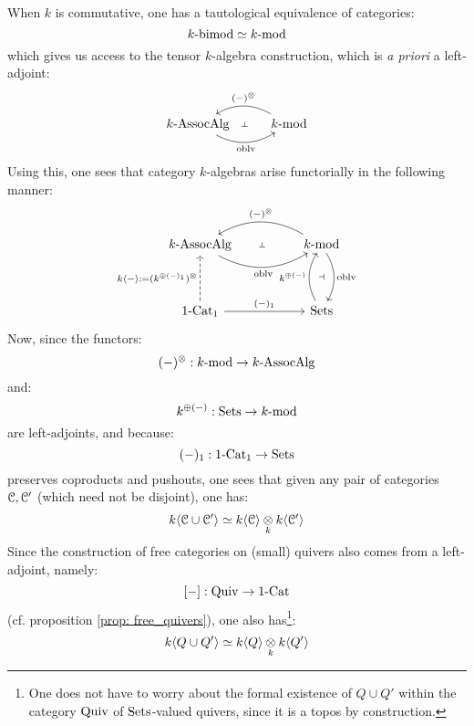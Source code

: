             \begin{remark} \label{remark: path_algebra_functor}
                When $k$ is commutative, one has a tautological equivalence of categories:
                    $$k\text{-}\mathrm{bimod} \simeq k\text{-}\mathrm{mod}$$
                which gives us access to the tensor $k$-algebra construction, which is \textit{a priori} a left-adjoint:
                    $$
                        \begin{tikzcd}
                        	{k\-\Assoc\Alg} & k\mod
                        	\arrow[""{name=0, anchor=center, inner sep=0}, "{(-)^{\tensor}}"', bend right, from=1-2, to=1-1]
                        	\arrow[""{name=1, anchor=center, inner sep=0}, "\oblv"', bend right, from=1-1, to=1-2]
                        	\arrow["\dashv"{anchor=center, rotate=-90}, draw=none, from=0, to=1]
                        \end{tikzcd}
                    $$
                Using this, one sees that category $k$-algebras arise functorially in the following manner:
                    $$
                        \begin{tikzcd}
                        	{k\-\Assoc\Alg} && k\mod \\
                        	\\
                        	{1\-\Cat_1} && \Sets
                        	\arrow[""{name=0, anchor=center, inner sep=0}, "{(-)^{\tensor}}"', bend right, from=1-3, to=1-1]
                        	\arrow[""{name=1, anchor=center, inner sep=0}, "\oblv"', bend right, from=1-1, to=1-3]
                        	\arrow["{(-)_1}", from=3-1, to=3-3]
                        	\arrow["{k\<-\> := ( k^{\oplus (-)_1} )^{\tensor}}", dashed, from=3-1, to=1-1]
                        	\arrow[""{name=2, anchor=center, inner sep=0}, "{k^{\oplus (-)}}", bend left, from=3-3, to=1-3]
                        	\arrow[""{name=3, anchor=center, inner sep=0}, "\oblv", bend left, from=1-3, to=3-3]
                        	\arrow["\dashv"{anchor=center, rotate=-90}, draw=none, from=0, to=1]
                        	\arrow["\dashv"{anchor=center}, draw=none, from=2, to=3]
                        \end{tikzcd}
                    $$
                Now, since the functors:
                    $$(-)^{\tensor}: k\mod \to k\-\Assoc\Alg$$
                and:
                    $$k^{\oplus (-)}: \mathrm{Sets} \to k\text{-}\mathrm{mod}$$
                are left-adjoints, and because:
                    $$(-)_1: 1\text{-}\mathrm{Cat}_1 \to \mathrm{Sets}$$
                preserves coproducts and pushouts, one sees that given any pair of categories $\mathcal{C}, \mathcal{C}'$ (which need not be disjoint), one has:
                    $$k\<\C \cup \C'\> \cong k\<\C\> \tensor_k k\<\C'\>$$
                Since the construction of free categories on (small) quivers also comes from a left-adjoint, namely:
                    $$[-]: \mathrm{Quiv} \to 1\text{-}\mathrm{Cat}$$
                (cf. proposition \ref{prop: free_quivers}), one also has\footnote{One does not have to worry about the formal existence of $Q \cup Q'$ within the category $\mathrm{Quiv}$ of $\mathrm{Sets}$-valued quivers, since it is a topos by construction.}:
                    $$k\<Q \cup Q'\> \cong k\<Q\> \tensor_k k\<Q'\>$$
            \end{remark}
